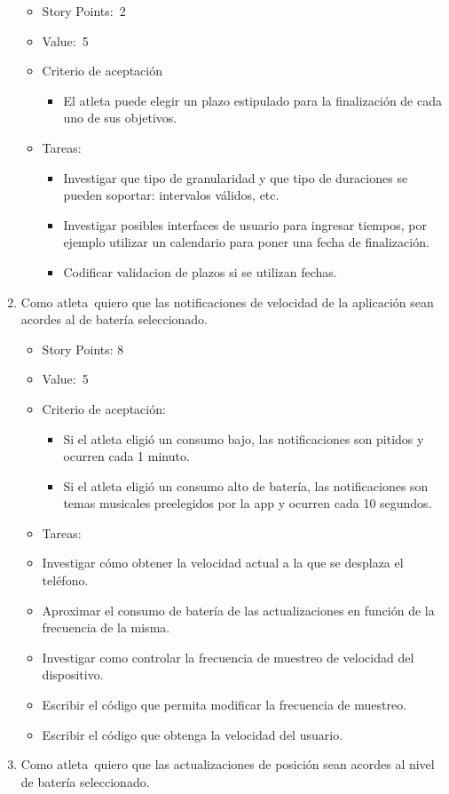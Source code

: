 \begin{enumerate}
  \begin{itemize}
  \item
    Story Points:~2
  \item
    Value:~5
  \item
    Criterio de aceptación

    \begin{itemize}
    \itemsep1pt\parskip0pt
    \item
      El atleta puede elegir un plazo estipulado para la finalización de
      cada uno de sus objetivos.
    \end{itemize}
  \item
    Tareas:

    \begin{itemize}
    \itemsep1pt\parskip0pt
    \item
      Investigar que tipo de granularidad y que tipo de duraciones se
      pueden soportar: intervalos válidos, etc.
    \item
      Investigar posibles interfaces de usuario para ingresar tiempos,
      por ejemplo utilizar un calendario para poner una fecha de
      finalización.
    \item
      Codificar validacion de plazos si se utilizan fechas.
    \end{itemize}
  \end{itemize}
\item
  Como atleta~quiero que las notificaciones de velocidad de la
  aplicación sean acordes al de batería seleccionado.

  \begin{itemize}
  \item
    Story Points: 8
  \item
    Value:~5
  \item
    Criterio de aceptación:

    \begin{itemize}
    \item
      Si el atleta eligió un consumo bajo, las notificaciones son
      pitidos y ocurren cada 1 minuto.
    \item
      Si el atleta eligió un consumo alto de batería, las notificaciones
      son temas musicales preelegidos por la app y ocurren cada 10
      segundos.
    \end{itemize}
  \item
    Tareas:
  \item
    Investigar cómo obtener la velocidad actual a la que se desplaza el
    teléfono.
  \item
    Aproximar el consumo de batería de las actualizaciones en función de
    la frecuencia de la misma.
  \item
    Investigar como controlar la frecuencia de muestreo de velocidad del
    dispositivo.
  \item
    Escribir el código que permita modificar la frecuencia de muestreo.
  \item
    Escribir el código que obtenga la velocidad del usuario.
  \end{itemize}
\item
  Como atleta~quiero que las actualizaciones de posición sean acordes al
  nivel de batería seleccionado.


\end{enumerate}
